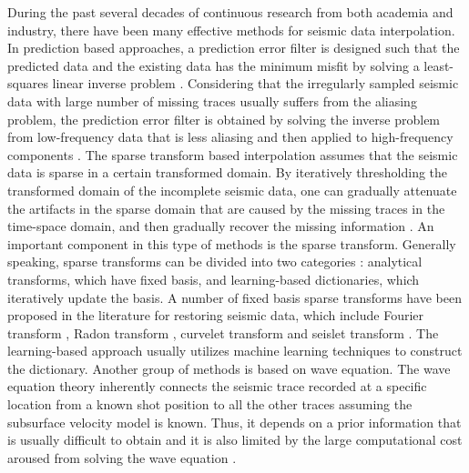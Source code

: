 During the past several decades of continuous research from both academia and industry, there have been many effective methods for seismic data interpolation. In prediction based approaches, a prediction error filter is designed such that the predicted data and the existing data has the minimum misfit by solving a least-squares linear inverse problem \cite[]{spitz1991,fomel2002pwd}. Considering that the irregularly sampled seismic data with large number of missing traces usually suffers from the aliasing problem, the prediction error filter is obtained by solving the inverse problem from low-frequency data that is less aliasing and then applied to high-frequency components \cite[]{mostafa2007}. The sparse transform based interpolation assumes that the seismic data is sparse in a certain transformed domain. By iteratively thresholding the transformed domain of the incomplete seismic data, one can gradually attenuate the artifacts in the sparse domain that are caused by the missing traces in the time-space domain, and then gradually recover the missing information \cite[]{yangkang2014halfthr,shuwei2015seg,shuwei20153,benfengpocs,benfeng2015}. An important component in this type of methods is the sparse transform. Generally speaking, sparse transforms can be divided into two categories \cite[]{yangkang2016dsd}: analytical transforms, which have fixed basis, and learning-based dictionaries, which iteratively update the basis. A number of fixed basis sparse transforms have been proposed in the literature for restoring seismic data, which include Fourier transform \cite[]{sacchi,duijndam,yangkang2014halfthr}, Radon transform \cite[]{trad,yu,wangradon}, curvelet transform \cite[]{herrmann,shahidi,liuwei2015,liuwei20162} and seislet transform \cite[]{fomel2010seislet,yangkang20142,shuwei20153}. The learning-based approach usually utilizes machine learning techniques to construct the dictionary. Another group of methods is based on wave equation. The wave equation theory inherently connects the seismic trace recorded at a specific location from a known shot position to all the other traces assuming the subsurface velocity model is known. Thus, it depends on a prior information that is usually difficult to obtain and it is also limited by the large computational cost aroused from solving the wave equation \cite[]{ronen,canning1996,fomel2003}. 

